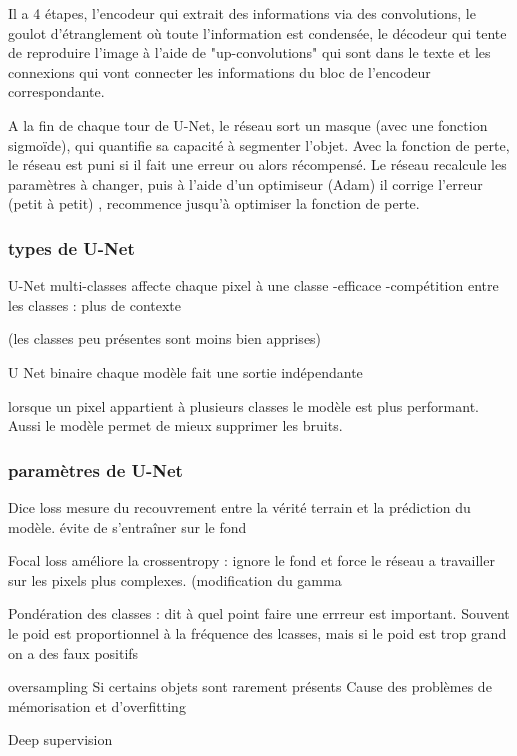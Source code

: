 \documentclass[10pt]{scrartcl}
\begin{document}
Il a 4 étapes, l'encodeur qui extrait des informations via des convolutions, le goulot d'étranglement où toute l'information est condensée, le décodeur qui tente de reproduire l'image à l'aide de "up-convolutions" qui sont dans le texte et les connexions qui vont connecter les informations du bloc de l'encodeur correspondante.  


A la fin de chaque tour de U-Net, le réseau sort un masque (avec une fonction sigmoïde), qui quantifie sa capacité à segmenter l'objet. 
Avec la fonction de perte, le réseau est puni si il fait une erreur ou alors récompensé. 
Le réseau recalcule les paramètres à changer, puis à l'aide d'un optimiseur (Adam) il corrige l'erreur (petit à petit) , recommence jusqu'à optimiser la fonction de perte. 

\subsubsection{types de U-Net}

U-Net multi-classes 
affecte chaque pixel à une classe 
-efficace 
-compétition entre les classes : plus de contexte

(les classes peu présentes sont moins bien apprises) 

U Net binaire 
chaque modèle fait une sortie indépendante 

lorsque un pixel appartient à plusieurs classes le modèle est plus performant. 
Aussi le modèle permet de mieux supprimer les bruits. 

\subsubsection{paramètres de U-Net}

Dice loss
mesure du recouvrement entre la vérité terrain et la prédiction du modèle. 
évite de s'entraîner sur le fond

Focal loss 
améliore la crossentropy : ignore le fond et force le réseau a travailler sur les pixels plus complexes. (modification du gamma

Pondération des classes 
: dit à quel point faire une errreur est important. 
Souvent le poid est proportionnel à la fréquence des lcasses, mais si le poid est trop grand on a des faux positifs 

oversampling
Si certains objets sont rarement présents  Cause des problèmes de mémorisation et d'overfitting


Deep supervision 
\end{document}
